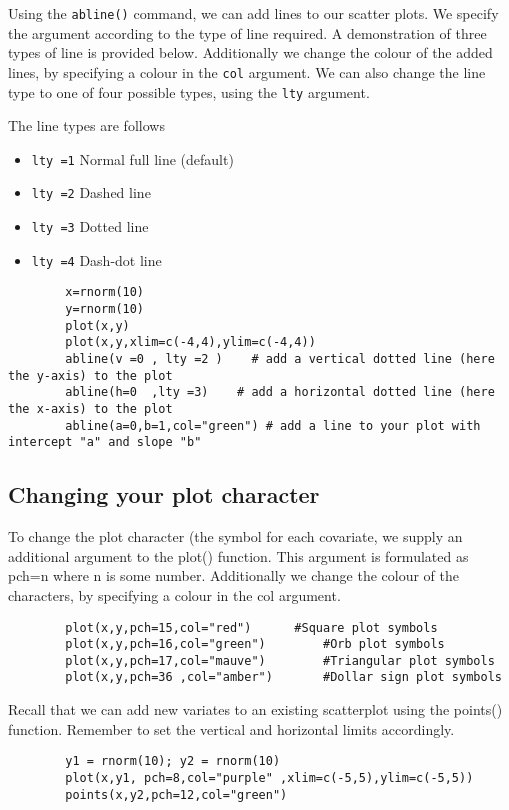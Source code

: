 \documentclass[a4paper,12pt]{article}
\begin{document}
\begin{itemize}
\begin{itemize}
		Using the \texttt{abline()} command, we can add lines to our scatter plots. We specify the argument according to the type of line required. A demonstration of three types of line is provided below.
		Additionally we change the colour of the added lines, by specifying a colour in the \texttt{col} argument. We can also change the line type to one of four possible types, using the \texttt{lty} argument.
		
		The line types are follows
		\begin{itemize}
			\item	\texttt{lty =1}   Normal full line (default)
			\item	\texttt{lty =2}   Dashed line
			\item	\texttt{lty =3}   Dotted line
			\item	\texttt{lty =4}   Dash-dot line
		\end{itemize}
		\large \begin{verbatim}
		x=rnorm(10)
		y=rnorm(10)
		plot(x,y)
		plot(x,y,xlim=c(-4,4),ylim=c(-4,4))
		abline(v =0 , lty =2 )    # add a vertical dotted line (here the y-axis) to the plot
		abline(h=0  ,lty =3)    # add a horizontal dotted line (here the x-axis) to the plot
		abline(a=0,b=1,col="green") # add a line to your plot with intercept "a" and slope "b"
		\end{verbatim}\large
		
		\subsection{Changing your plot character}
		
		To change the plot character (the symbol for each covariate, we supply an additional argument to the plot() function.  This argument is formulated as pch=n where n is some number.
		Additionally we change the colour of the characters, by specifying a colour in the col argument.
		\large \begin{verbatim}
		plot(x,y,pch=15,col="red")		#Square plot symbols
		plot(x,y,pch=16,col="green")		#Orb plot symbols
		plot(x,y,pch=17,col="mauve")		#Triangular plot symbols
		plot(x,y,pch=36	,col="amber")		#Dollar sign plot symbols
		\end{verbatim}\large
		Recall that we can add new variates to an existing scatterplot using the points() function. Remember to set the vertical and horizontal limits accordingly.
		\large \begin{verbatim}
		y1 = rnorm(10); y2 = rnorm(10)
		plot(x,y1, pch=8,col="purple" ,xlim=c(-5,5),ylim=c(-5,5))
		points(x,y2,pch=12,col="green")
		\end{verbatim}\large

\end{itemize}
\end{itemize}
\end{document}
